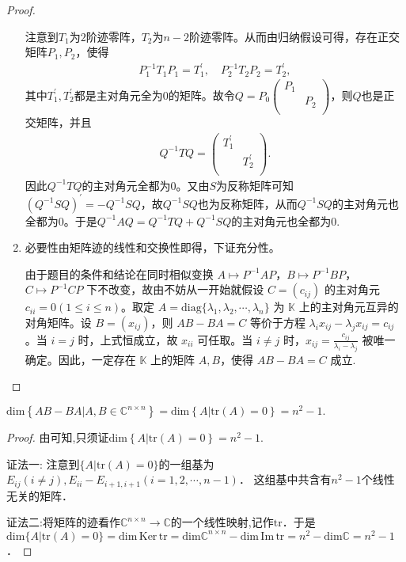 \documentclass[../../main.tex]{subfiles}
\begin{document}
\begin{proof}
\begin{enumerate}[(1)]
注意到\(T_1\)为\(2\)阶迹零阵，\(T_2\)为\(n - 2\)阶迹零阵。从而由归纳假设可得，存在正交矩阵\(P_1,P_2\)，使得
\begin{align*}
P_{1}^{-1}T_1P_1=T_{1}^{\prime},\quad P_{2}^{-1}T_2P_2=T_{2}^{\prime},
\end{align*}
其中\(T_{1}^{\prime},T_{2}^{\prime}\)都是主对角元全为\(0\)的矩阵。故令\(Q = P_0\left( \begin{matrix}
P_1& \\
& P_2\\
\end{matrix} \right)\)，则\(Q\)也是正交矩阵，并且
\begin{align*}
Q^{-1}TQ=\left( \begin{matrix}
T_{1}^{\prime}& \\
& T_{2}^{\prime}\\
\end{matrix} \right).
\end{align*}
因此\(Q^{-1}TQ\)的主对角元全都为\(0\)。又由\(S\)为反称矩阵可知\((Q^{-1}SQ)^\prime = -Q^{-1}SQ\)，故\(Q^{-1}SQ\)也为反称矩阵，从而\(Q^{-1}SQ\)的主对角元也全都为\(0\)。于是\(Q^{-1}AQ = Q^{-1}TQ + Q^{-1}SQ\)的主对角元也全都为\(0\).

\item 必要性由矩阵迹的线性和交换性即得，下证充分性。

由于题目的条件和结论在同时相似变换 $A\mapsto P^{-1}AP$，$B\mapsto P^{-1}BP$，$C\mapsto P^{-1}CP$ 下不改变，故由不妨从一开始就假设 $C=(c_{ij})$ 的主对角元 $c_{ii}=0 (1\leq i\leq n)$。取定 $A = \mathrm{diag}\{\lambda_1,\lambda_2,\cdots,\lambda_n\}$ 为 $\mathbb{K}$ 上的主对角元互异的对角矩阵。设 $B=(x_{ij})$，则 $AB - BA = C$ 等价于方程 $\lambda_ix_{ij}-\lambda_jx_{ij}=c_{ij}$。当 $i = j$ 时，上式恒成立，故 $x_{ii}$ 可任取。当 $i\neq j$ 时，$x_{ij}=\frac{c_{ij}}{\lambda_i - \lambda_j}$ 被唯一确定。因此，一定存在 $\mathbb{K}$ 上的矩阵 $A,B$，使得 $AB - BA = C$ 成立.
\end{enumerate}
\end{proof}

\begin{corollary}\label{corollary:AB-BA的维数等于迹零矩阵的维数}
$\mathrm{dim}\left\{ AB-BA|A,B\in \mathbb{C} ^{n\times n} \right\} =\mathrm{dim}\left\{ A|\mathrm{tr}\left( A \right) =0 \right\} =n^2-1.$
\end{corollary}
\begin{proof}
由可知,只须证$\mathrm{dim}\left\{ A|\mathrm{tr}\left( A \right) =0 \right\} =n^2-1.$

{\color{blue} 证法一:}
注意到$\{ A|\mathrm{tr}(A) =0 \}$的一组基为  
$E_{ij}(i\ne j),E_{ii}-E_{i+1,i+1}(i=1,2,\cdots,n-1)$．  
这组基中共含有$n^2-1$个线性无关的矩阵．  

{\color{blue} 证法二:}将矩阵的迹看作$\mathbb{C} ^{n\times n}\rightarrow \mathbb{C}$的一个线性映射,记作$\mathrm{tr}$．于是  
$\mathrm{dim}\{ A|\mathrm{tr}(A) =0 \} = \mathrm{dim}\,\mathrm{Ker}\,\mathrm{tr} = \mathrm{dim}\mathbb{C} ^{n\times n} - \mathrm{dim}\,\mathrm{Im}\,\mathrm{tr} = n^2 - \mathrm{dim}\mathbb{C} = n^2-1$．
\end{proof}
\end{document}
